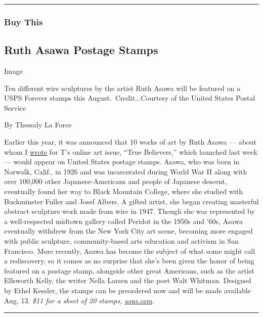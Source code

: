 \begin{center}\rule{0.5\linewidth}{\linethickness}\end{center}

\hypertarget{buy-this}{%
\subsubsection{Buy This}\label{buy-this}}

\hypertarget{ruth-asawa-postage-stamps}{%
\subsection{Ruth Asawa Postage Stamps}\label{ruth-asawa-postage-stamps}}

Image

Ten different wire sculptures by the artist Ruth Asawa will be featured
on a USPS Forever stamps this August.~Credit...Courtesy of the United
States Postal Service

By Thessaly La Force

Earlier this year, it was announced that 10 works of art by Ruth Asawa
--- about whom I
\href{https://www.nytimes.com/2020/07/20/t-magazine/ruth-asawa.html}{wrote}
for T's online art issue, ``True Believers,'' which launched last week
--- would appear on United States postage stamps. Asawa, who was born in
Norwalk, Calif., in 1926 and was incarcerated during World War II along
with over 100,000 other Japanese-Americans and people of Japanese
descent, eventually found her way to Black Mountain College, where she
studied with Buckminster Fuller and Josef Albers. A gifted artist, she
began creating masterful abstract sculpture work made from wire in 1947.
Though she was represented by a well-respected midtown gallery called
Peridot in the 1950s and '60s, Asawa eventually withdrew from the New
York City art scene, becoming more engaged with public sculpture,
community-based arts education and activism in San Francisco. More
recently, Asawa has become the subject of what some might call a
rediscovery, so it comes as no surprise that she's been given the honor
of being featured on a postage stamp, alongside other great Americans,
such as the artist Ellsworth Kelly, the writer Nella Larsen and the poet
Walt Whitman. Designed by Ethel Kessler, the stamps can be preordered
now and will be made available Aug. 13. \emph{\$11 for a sheet of 20
stamps,}
\href{https://store.usps.com/store/product/buy-stamps/ruth-asawa-S_476304}{\emph{usps.com}}\emph{.}

\begin{center}\rule{0.5\linewidth}{\linethickness}\end{center}

